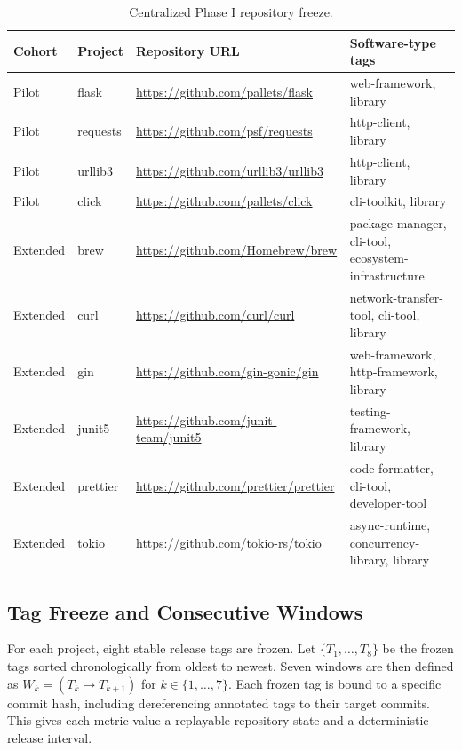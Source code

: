 \begin{table}[H]
\centering
\scriptsize
\renewcommand{\arraystretch}{1.12}
\begin{tabularx}{\textwidth}{p{1.25cm}p{1.45cm}X p{3.2cm}}
\toprule
\textbf{Cohort} & \textbf{Project} & \textbf{Repository URL} & \textbf{Software-type tags} \\
\midrule
Pilot & flask    & \url{https://github.com/pallets/flask}     & web-framework, library \\
Pilot & requests & \url{https://github.com/psf/requests}      & http-client, library \\
Pilot & urllib3  & \url{https://github.com/urllib3/urllib3}   & http-client, library \\
Pilot & click    & \url{https://github.com/pallets/click}     & cli-toolkit, library \\
Extended & brew     & \url{https://github.com/Homebrew/brew}     & package-manager, cli-tool, ecosystem-infrastructure \\
Extended & curl     & \url{https://github.com/curl/curl}         & network-transfer-tool, cli-tool, library \\
Extended & gin      & \url{https://github.com/gin-gonic/gin}     & web-framework, http-framework, library \\
Extended & junit5   & \url{https://github.com/junit-team/junit5} & testing-framework, library \\
Extended & prettier & \url{https://github.com/prettier/prettier} & code-formatter, cli-tool, developer-tool \\
Extended & tokio    & \url{https://github.com/tokio-rs/tokio}    & async-runtime, concurrency-library, library \\
\bottomrule
\end{tabularx}
\caption{Centralized Phase I repository freeze.}
\label{tab:round1_freeze}
\end{table}

\subsection{Tag Freeze and Consecutive Windows}
\label{sec:phase1_frozen_windows}

For each project, eight stable release tags are frozen. Let $\{T_1,\dots,T_8\}$ be the
frozen tags sorted chronologically from oldest to newest. Seven windows are then defined as
$W_k=(T_k \rightarrow T_{k+1})$ for $k\in\{1,\dots,7\}$. Each frozen tag is bound to a
specific commit hash, including dereferencing annotated tags to their target commits. This
gives each metric value a replayable repository state and a deterministic release interval.

